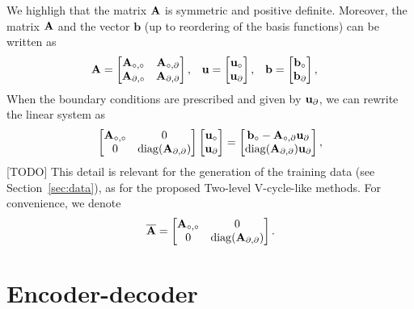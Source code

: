 We highligh that the matrix \(\mathbf{A}\) is symmetric and positive definite.
Moreover, the matrix \(\mathbf{A}\) and the vector \(\mathbf{b}\) (up to reordering of the basis functions) can be written as
\begin{align*}
    \mathbf{A} & = \begin{bmatrix}
        \mathbf{A}_{\circ, \circ} & \mathbf{A}_{\circ, \partial} \\
        \mathbf{A}_{\partial, \circ} & \mathbf{A}_{\partial, \partial}
    \end{bmatrix}, &
    \mathbf{u} & = \begin{bmatrix}
        \mathbf{u}_{\circ} \\
        \mathbf{u}_{\partial}
    \end{bmatrix}, &
    \mathbf{b} & = \begin{bmatrix}
        \mathbf{b}_{\circ} \\
        \mathbf{b}_{\partial}
    \end{bmatrix},
\end{align*}
When the boundary conditions are prescribed and given by \(\mathbf{u}_{\partial}\), we can rewrite the linear system as
\begin{equation}
    \begin{bmatrix}
        \mathbf{A}_{\circ, \circ} & 0 \\
        0 & \operatorname{diag}(\mathbf{A}_{\partial, \partial})
    \end{bmatrix}
    \begin{bmatrix}
        \mathbf{u}_{\circ} \\
        \mathbf{u}_{\partial}
    \end{bmatrix}
    =
    \begin{bmatrix}
        \mathbf{b}_{\circ} - \mathbf{A}_{\circ, \partial} \mathbf{u}_{\partial} \\
        \operatorname{diag}(\mathbf{A}_{\partial, \partial}) \mathbf{u}_{\partial}
    \end{bmatrix},
\end{equation}
[TODO]
This detail is relevant for the generation of the training data (see Section~\ref{sec:data}), as for the proposed Two-level V-cycle-like methods.
For convenience, we denote
\begin{equation}
    \overline{\mathbf{A}} = \begin{bmatrix}
        \mathbf{A}_{\circ, \circ} & 0 \\
        0 & \operatorname{diag}(\mathbf{A}_{\partial, \partial})
    \end{bmatrix}.
\end{equation}

\section{Encoder-decoder}
\label{sec:e-d}

